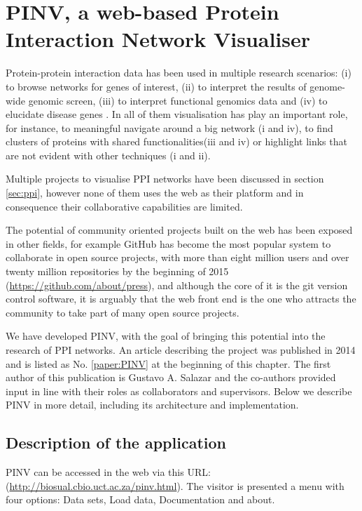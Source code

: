 \newpage





\section{PINV, a web-based Protein Interaction Network Visualiser }  \label{section:pinv}
Protein-protein interaction data has been used in multiple research scenarios: (i) to browse networks for genes of interest, (ii) to interpret the results of genome-wide genomic screen, (iii) to interpret functional genomics data and (iv) to elucidate disease genes \cite{FRA2013}. In all of them visualisation has play an important role, for instance,  to meaningful navigate around a big network (i and iv), to find clusters of proteins with shared functionalities(iii and iv)  or highlight links that are not evident with other techniques (i and ii).

Multiple projects to visualise PPI networks have been discussed in section \ref{sec:ppi}, however none of them uses the web as their platform and in consequence their collaborative capabilities are limited. 

The potential of community oriented projects built on the web has been exposed in other fields, for example GitHub has become the most popular system to collaborate in open source projects, with more than eight million users and over twenty million repositories by the beginning of 2015 (\url{https://github.com/about/press}), and although the core of it is the git version control software, it is arguably that the web front end is the one who attracts the community to take part of many open source projects.

We have developed PINV, with the goal of bringing this potential into the research of PPI networks. An article describing the project was published in 2014 and is listed as No. \ref{paper:PINV} at the beginning of this chapter. The first author of this publication is Gustavo A. Salazar and the co-authors provided input in line with their roles as collaborators and supervisors. Below we describe PINV in more detail, including its architecture and implementation.

\subsection{Description of the application}

PINV can be accessed in the web via this URL: (\url{http://biosual.cbio.uct.ac.za/pinv.html}). The visitor is presented a menu with four options: Data sets, Load data, Documentation and about. 

